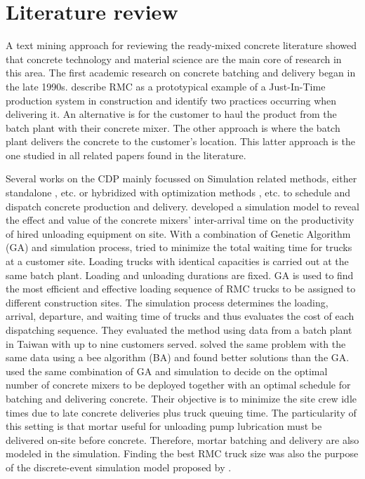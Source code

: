 \documentclass{article}
\begin{document}
{\section{Literature review}
\label{lit_review}

A text mining approach for reviewing the ready-mixed concrete literature \citep{maghrebi2015text} showed that concrete technology and material science are the main core of research in this area. The first academic research on concrete batching and delivery began in the late 1990s. \cite{tommelein1999just} describe RMC as a prototypical example of a Just-In-Time production system in construction and identify two practices occurring when delivering it. An alternative is for the customer to haul the product from the batch plant with their concrete mixer. The other approach is where the batch plant delivers the concrete to the customer's location. This latter approach is the one studied in all related papers found in the literature.

Several works on the CDP mainly focussed on Simulation related methods, either standalone \citep{zayed2001simulation, wang2001scheduling, tian_simulation_based_2010, panas_simulation_based_2013, galic2016simulation}, etc. or hybridized with optimization methods \citep{feng2004optimizing, lu2005optimized, feng_integrating_2006}, etc. to schedule and dispatch concrete production and delivery. \cite{wang2001scheduling} developed a simulation model to reveal the effect and value of the concrete mixers' inter-arrival time on the productivity of hired unloading equipment on site. With a combination of Genetic Algorithm (GA) and simulation process, \cite{feng2004optimizing} tried to minimize the total waiting time for trucks at a customer site. Loading trucks with identical capacities is carried out at the same batch plant. Loading and unloading durations are fixed. GA is used to find the most efficient and effective loading sequence of RMC trucks to be assigned to different construction sites. The simulation process determines the loading, arrival, departure, and waiting time of trucks and thus evaluates the cost of each dispatching sequence. They evaluated the method using data from a batch plant in Taiwan with up to nine customers served. \cite{mayteekrieangkrai2015optimized} solved the same problem with the same data using a bee algorithm (BA) and found better solutions than the GA. \cite{lu2005optimized} used the same combination of GA and simulation to decide on the optimal number of concrete mixers to be deployed together with an optimal schedule for batching and delivering concrete. Their objective is to minimize the site crew idle times due to late concrete deliveries plus truck queuing time. The particularity of this setting is that mortar useful for unloading pump lubrication must be delivered on-site before concrete. Therefore, mortar batching and delivery are also modeled in the simulation. Finding the best RMC truck size was also the purpose of the discrete-event simulation model proposed by \cite{panas_simulation_based_2013}.

}
\end{document}
